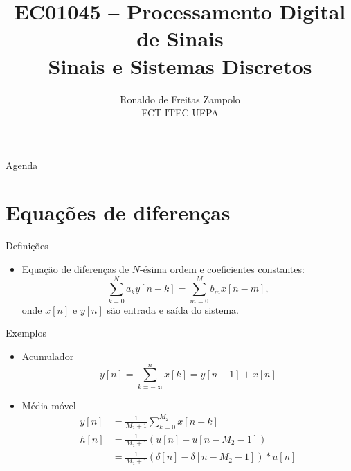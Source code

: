 \documentclass[
size=17pt,
paper=smartboard,
mode=present,
display=slidesnotes,
style=sailor,
nopagebreaks,
blackslide,
fleqn]{powerdot}
\title{\Large EC01045 -- Processamento Digital de Sinais\\ \vspace{1cm}Sinais e Sistemas Discretos}
\author{Ronaldo de Freitas Zampolo\\FCT-ITEC-UFPA}
\date{ }
\begin{document}
   \maketitle[randomdots={false}]
   \begin{slide}[toc=]{Agenda}
      \tableofcontents[content=sections]
   \end{slide}

\section[slide=true]{Equações de diferenças}
\begin{slide}[toc=]{Definições}
   \begin{itemize}
    \item Equação de diferenças de $N$-ésima ordem e coeficientes constantes:
    \begin{equation*}
       \sum_{ k = 0 }^{ N } a_k y[ n - k ]=\sum_{ m = 0 }^{ M } b_m x[ n - m ],
    \end{equation*}
    onde $x[n]$ e $y[n]$ são entrada e saída do sistema.
   \end{itemize}
\end{slide}

\begin{slide}[toc=]{Exemplos}
   \begin{itemize}
   \item Acumulador
    \begin{equation*}
         y[n] = \sum_{ k = -\infty}^{n} x[k]= y[n-1] + x[n]
   \end{equation*}\pause
    \item Média móvel
    \begin{align*}
         y[n] &= \frac{1}{M_2+1}\sum_{ k = 0}^{M_2} x[n-k]\\
         h[n] &= \frac{1}{M_2+1}\left ( u[n] - u[n-M_2-1] \right )\\
              &= \frac{1}{M_2+1}\left ( \delta[n] - \delta[n-M_2-1] \right )\ast u[n]
    \end{align*}
   \end{itemize}
\end{slide}
\end{document}
